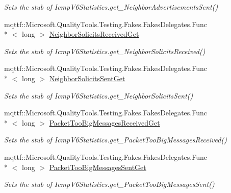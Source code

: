 \begin{DoxyCompactItemize}
\begin{DoxyCompactList}\small\item\em Sets the stub of Icmp\-V6\-Statistics.\-get\-\_\-\-Neighbor\-Advertisements\-Sent()\end{DoxyCompactList}\item 
mqttf\-::\-Microsoft.\-Quality\-Tools.\-Testing.\-Fakes.\-Fakes\-Delegates.\-Func\\*
$<$ long $>$ \hyperlink{class_system_1_1_net_1_1_network_information_1_1_fakes_1_1_stub_icmp_v6_statistics_a32965bb13f239b9646535ff2a0e5ca6b}{Neighbor\-Solicits\-Received\-Get}
\begin{DoxyCompactList}\small\item\em Sets the stub of Icmp\-V6\-Statistics.\-get\-\_\-\-Neighbor\-Solicits\-Received()\end{DoxyCompactList}\item 
mqttf\-::\-Microsoft.\-Quality\-Tools.\-Testing.\-Fakes.\-Fakes\-Delegates.\-Func\\*
$<$ long $>$ \hyperlink{class_system_1_1_net_1_1_network_information_1_1_fakes_1_1_stub_icmp_v6_statistics_ad9ddf6343e9d2467c976b0f3546ebbe6}{Neighbor\-Solicits\-Sent\-Get}
\begin{DoxyCompactList}\small\item\em Sets the stub of Icmp\-V6\-Statistics.\-get\-\_\-\-Neighbor\-Solicits\-Sent()\end{DoxyCompactList}\item 
mqttf\-::\-Microsoft.\-Quality\-Tools.\-Testing.\-Fakes.\-Fakes\-Delegates.\-Func\\*
$<$ long $>$ \hyperlink{class_system_1_1_net_1_1_network_information_1_1_fakes_1_1_stub_icmp_v6_statistics_a7a4574a11b47922a7641040781fcb38f}{Packet\-Too\-Big\-Messages\-Received\-Get}
\begin{DoxyCompactList}\small\item\em Sets the stub of Icmp\-V6\-Statistics.\-get\-\_\-\-Packet\-Too\-Big\-Messages\-Received()\end{DoxyCompactList}\item 
mqttf\-::\-Microsoft.\-Quality\-Tools.\-Testing.\-Fakes.\-Fakes\-Delegates.\-Func\\*
$<$ long $>$ \hyperlink{class_system_1_1_net_1_1_network_information_1_1_fakes_1_1_stub_icmp_v6_statistics_abf837432978c3227c34e0b0c7dd20427}{Packet\-Too\-Big\-Messages\-Sent\-Get}
\begin{DoxyCompactList}\small\item\em Sets the stub of Icmp\-V6\-Statistics.\-get\-\_\-\-Packet\-Too\-Big\-Messages\-Sent()\end{DoxyCompactList}\item 

\end{DoxyCompactItemize}
